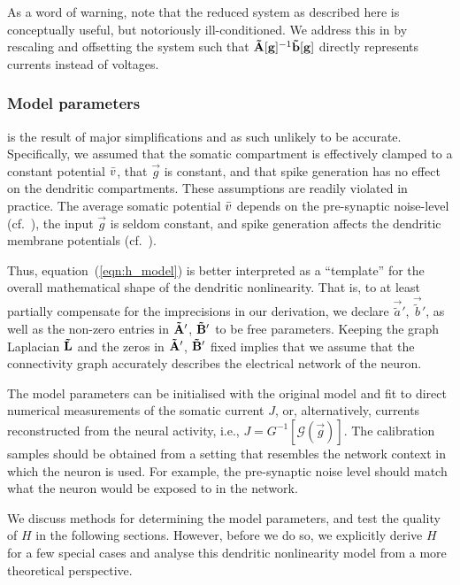 As a word of warning, note that the reduced system as described here is conceptually useful, but notoriously ill-conditioned. 
We address this in  by rescaling and offsetting the system such that $\mathbf{\tilde A}[\mathbf{g}]^{-1} \mathbf{\tilde b}[\mathbf{g}]$ directly represents currents instead of voltages.

\subsubsection{Model parameters}
 is the result of major simplifications and as such unlikely to be accurate.
Specifically, we assumed that the somatic compartment is effectively clamped to a constant potential ${{\bar v}}$, that $\vec g$ is constant, and that spike generation has no effect on the dendritic compartments.
These assumptions are readily violated in practice.
The average somatic potential ${{\bar v}}$ depends on the pre-synaptic noise-level (cf.~), the input $\vec g$ is seldom constant, and spike generation affects the dendritic membrane potentials (cf.~).

Thus, equation~(\ref{eqn:h_model}) is better interpreted as a \enquote{template} for the overall mathematical shape of the dendritic nonlinearity.
That is, to at least partially compensate for the imprecisions in our derivation, we declare $\vec{\tilde a}'$, $\vec{\tilde b}'$, as well as the non-zero entries in $\mathbf{\tilde A}'$, $\mathbf{\tilde B}'$ to be free parameters.
Keeping the graph Laplacian $\mathbf{\tilde L}$ and the zeros in $\mathbf{\tilde A'}$, $\mathbf{\tilde B'}$ fixed implies that we assume that the connectivity graph accurately describes the electrical network of the neuron.


The model parameters can be initialised with the original model and fit to direct numerical measurements of the somatic current $J$, or, alternatively, currents reconstructed from the neural activity, i.e., $J = G^{-1}[\mathscr{G}(\vec g)]$.
The calibration samples should be obtained from a setting that resembles the network context in which the neuron is used.
For example, the pre-synaptic noise level should match what the neuron would be exposed to in the network.

We discuss methods for determining the model parameters, and test the quality of $H$ in the following sections.
However, before we do so, we explicitly derive $H$ for a few special cases and analyse this dendritic nonlinearity model from a more theoretical perspective.


